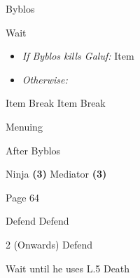 \begin{paracol}{2}
\begin{boss}{Byblos}
    \varwb
    \begin{round}{1}
        \bartz Wait
        \begin{itemize}
            \item \textit{If Byblos kills Galuf:} Item \then \battleGroup{\phoenixDown}
            \item \textit{Otherwise:} 
        \end{itemize}
        \lenna Item \then {} \then Break
        \faris Item \then {} \then Break
    \end{round}
    \begin{bossPart}{Menuing}
        \item {}
        \item {}
        \vspace{1mm}
        \item[] 
    \end{bossPart}
    \varwe
\end{boss}

\begin{menu}{After Byblos}
    \begin{jobMenu}
        \faris Ninja \textbf{(3\pointRight)} \equip{\stealthRobe}
        \lenna Mediator \textbf{(3\pointLeft)} \ability{!\black}
    \end{jobMenu}
\end{menu}

\begin{encounter}{Page 64}
	\varwb
	\begin{notes}
		\item {}
	\end{notes}
	\begin{round}{1}
		\faris \leftCommand{\throw} \then \broadsword
        \bartz Defend
        \lenna \rightCommand{\black} \then \fire
        \galuf Defend
	\end{round}
    \begin{round}{2 (Onwards)}
		\faris \leftCommand{\throw} \then \mythrilKnife
        \bartz Defend
        \item Wait until he uses L.5 Death
        \lenna \leftCommand{\catch}
	\end{round}
	\varwe
\end{encounter}

\end{paracol}